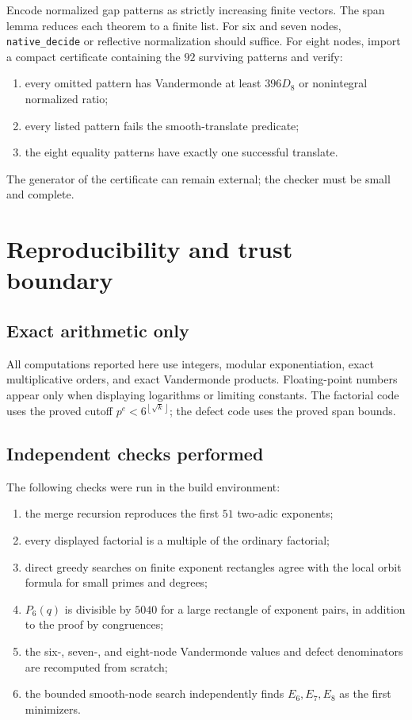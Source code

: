 \documentclass[11pt,oneside]{article}
\theoremstyle{definition}
\theoremstyle{remark}
\newcommand{\floor}[1]{\left\lfloor #1\right\rfloor}
\begin{document}
Encode normalized gap patterns as strictly increasing finite vectors.  The span lemma reduces
each theorem to a finite list.  For six and seven nodes, \texttt{native\_decide} or reflective
normalization should suffice.  For eight nodes, import a compact certificate containing the
\(92\) surviving patterns and verify:
\begin{enumerate}
\item every omitted pattern has Vandermonde at least \(396D_8\) or nonintegral normalized
ratio;
\item every listed pattern fails the smooth-translate predicate;
\item the eight equality patterns have exactly one successful translate.
\end{enumerate}
The generator of the certificate can remain external; the checker must be small and complete.

\section{Reproducibility and trust boundary}
\label{sec:reproducibility}

\subsection{Exact arithmetic only}

All computations reported here use integers, modular exponentiation, exact multiplicative
orders, and exact Vandermonde products.  Floating-point numbers appear only when displaying
logarithms or limiting constants.  The factorial code uses the proved cutoff
\(p^e<6^{\floor{\sqrt k}}\); the defect code uses the proved span bounds.

\subsection{Independent checks performed}

The following checks were run in the build environment:
\begin{enumerate}
\item the merge recursion reproduces the first \(51\) two-adic exponents;
\item every displayed factorial is a multiple of the ordinary factorial;
\item direct greedy searches on finite exponent rectangles agree with the local orbit formula
for small primes and degrees;
\item \(P_6(q)\) is divisible by \(5040\) for a large rectangle of exponent pairs, in addition
to the proof by congruences;
\item the six-, seven-, and eight-node Vandermonde values and defect denominators are
recomputed from scratch;
\item the bounded smooth-node search independently finds \(E_6,E_7,E_8\) as the first
minimizers.
\end{enumerate}
\end{document}
